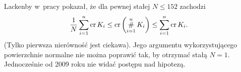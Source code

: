 Lackenby w~pracy \cite{lackenby09} pokazał, że dla pewnej stałej $N \le 152$ zachodzi
\begin{equation}
    \frac 1 N \sum_{i=1}^n \operatorname{cr}{K_i} \le \operatorname{cr} \left(\operatorname*{\#}_{i=1}^n K_i\right) \le \sum_{i=1}^n \operatorname{cr}{K_i}.
\end{equation}
(Tylko pierwsza nierówność jest ciekawa).
Jego argumentu wykorzystującego powierzchnie normalne nie można poprawić tak, by otrzymać stałą $N = 1$.
Jednocześnie od 2009 roku nie widać postępu nad hipotezą.

%



